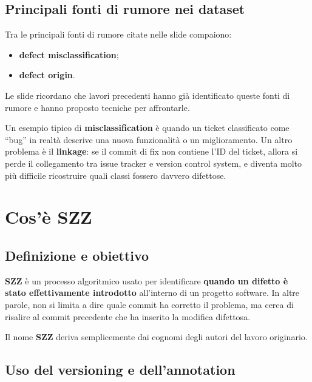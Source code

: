 \subsection{Principali fonti di rumore nei dataset}

Tra le principali fonti di rumore citate nelle slide compaiono:

\begin{itemize}
    \item \textbf{defect misclassification};
    \item \textbf{defect origin}.
\end{itemize}

\begin{notaslide}
Le slide ricordano che lavori precedenti hanno già identificato queste fonti di rumore e hanno proposto tecniche per affrontarle.
\end{notaslide}

\begin{notaprof}
Un esempio tipico di \textbf{misclassification} è quando un ticket classificato come ``bug'' in realtà descrive una nuova funzionalità o un miglioramento. Un altro problema è il \textbf{linkage}: se il commit di fix non contiene l'ID del ticket, allora si perde il collegamento tra issue tracker e version control system, e diventa molto più difficile ricostruire quali classi fossero davvero difettose.
\end{notaprof}

\section{Cos'è SZZ}

\subsection{Definizione e obiettivo}

\textbf{SZZ} è un processo algoritmico usato per identificare \textbf{quando un difetto è stato effettivamente introdotto} all'interno di un progetto software. In altre parole, non si limita a dire quale commit ha corretto il problema, ma cerca di risalire al commit precedente che ha inserito la modifica difettosa.

\begin{notaprof}
Il nome \textbf{SZZ} deriva semplicemente dai cognomi degli autori del lavoro originario.
\end{notaprof}

\subsection{Uso del versioning e dell'annotation}

